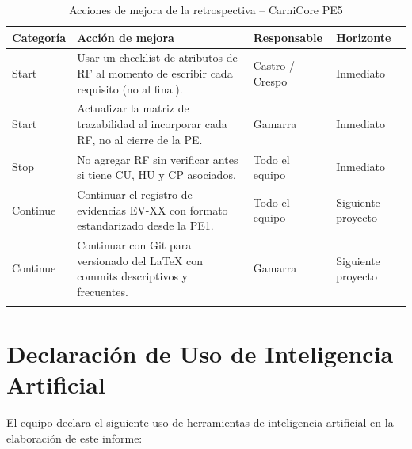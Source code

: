 \documentclass[11pt,a4paper]{article}
\begin{document}
\begin{longtable}{|p{2.5cm}|p{6cm}|p{2.5cm}|p{2.5cm}|}
\hline
\textbf{Categoría} & \textbf{Acción de mejora} & \textbf{Responsable} & \textbf{Horizonte} \\
\hline
Start & Usar un checklist de atributos de RF al momento de escribir cada requisito (no al final). & Castro / Crespo & Inmediato \\
\hline
Start & Actualizar la matriz de trazabilidad al incorporar cada RF, no al cierre de la PE. & Gamarra & Inmediato \\
\hline
Stop & No agregar RF sin verificar antes si tiene CU, HU y CP asociados. & Todo el equipo & Inmediato \\
\hline
Continue & Continuar el registro de evidencias EV-XX con formato estandarizado desde la PE1. & Todo el equipo & Siguiente proyecto \\
\hline
Continue & Continuar con Git para versionado del LaTeX con commits descriptivos y frecuentes. & Gamarra & Siguiente proyecto \\
\hline
\caption{Acciones de mejora de la retrospectiva -- CarniCore PE5}
\end{longtable}

\section{Declaración de Uso de Inteligencia Artificial}
\label{anx:ia_decl}

El equipo declara el siguiente uso de herramientas de inteligencia artificial en la elaboración de este informe:
\end{document}
